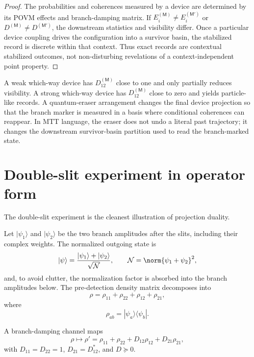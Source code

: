 \documentclass[11pt]{article}
\newcommand{\Meas}{\mathsf M}
\begin{document}
\begin{proof}
The probabilities and coherences measured by a device are determined by its POVM effects
and branch-damping matrix. If \(E_i^{(\Meas)}\neq E_i^{(\Meas')}\) or
\(D^{(\Meas)}\neq D^{(\Meas')}\), the downstream statistics and visibility differ. Once a
particular device coupling drives the configuration into a survivor basin, the stabilized
record is discrete within that context. Thus exact records are contextual stabilized outcomes,
not non-disturbing revelations of a context-independent point property.
\end{proof}

\begin{remark}
A weak which-way device has \(D_{12}^{(\Meas)}\) close to one and only partially reduces
visibility. A strong which-way device has \(D_{12}^{(\Meas)}\) close to zero and yields
particle-like records. A quantum-eraser arrangement changes the final device projection so
that the branch marker is measured in a basis where conditional coherences can reappear.
In MTT language, the eraser does not undo a literal past trajectory; it changes the downstream
survivor-basin partition used to read the branch-marked state.
\end{remark}



\section{Double-slit experiment in operator form}

The double-slit experiment is the cleanest illustration of projection duality.

Let \(|\psi_1\rangle\) and \(|\psi_2\rangle\) be the two branch amplitudes after the slits,
including their complex weights. The normalized outgoing state is
\[
  |\psi\rangle
  =
  \frac{|\psi_1\rangle+|\psi_2\rangle}{\sqrt{\mathcal N}},
  \qquad
  \mathcal N=\norm{\psi_1+\psi_2}^2,
\]
and, to avoid clutter, the normalization factor is absorbed into the branch amplitudes below. The pre-detection density matrix decomposes into
\[
  \rho
  =
  \rho_{11}+\rho_{22}+\rho_{12}+\rho_{21},
\]
where
\[
  \rho_{ab}=|\psi_a\rangle\langle\psi_b|.
\]

A branch-damping channel maps
\[
  \rho
  \mapsto
  \rho'
  =
  \rho_{11}+\rho_{22}
  +
  D_{12}\rho_{12}
  +
  D_{21}\rho_{21},
\]
with \(D_{11}=D_{22}=1\), \(D_{21}=D_{12}^\ast\), and \(D\succeq0\).
\end{document}
